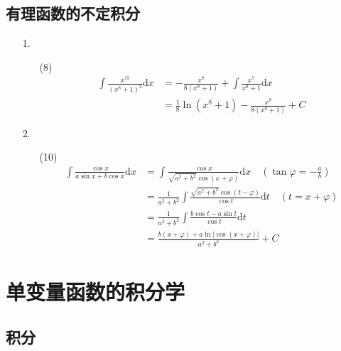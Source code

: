 \documentclass[oneside]{ctexbook} %
\begin{document}
\section{有理函数的不定积分}

\begin{enumerate}
    \item[1.]
    \begin{enumerate}
        \item[(8)]
        $$
        \begin{aligned}
            \int \frac{x^{15}}{(x^8 + 1)^2} \mathrm dx &= - \frac{x^8}{8(x^8 + 1)} + \int \frac{x^7}{x^8 + 1} \mathrm dx \\
            &= \frac 1 8 \ln(x^8 + 1) - \frac{x^8}{8(x^8 + 1)} + C
        \end{aligned}
        $$
    \end{enumerate}
    \item[2.]
    \begin{enumerate}
        \item[(10)]
        $$
        \begin{aligned}
            \int \frac{\cos x}{a\sin x + b\cos x} \mathrm dx &= \int \frac{\cos x}{\sqrt{a^2 + b^2} \cos(x + \varphi)} \mathrm dx \quad (\tan \varphi = - \frac a b) \\
            &= \frac 1 {a^2 + b^2} \int \frac{\sqrt{a^2 + b^2} \cos (t - \varphi)}{\cos t} \mathrm dt \quad (t = x + \varphi) \\
            &= \frac 1 {a^2 + b^2} \int \frac{b\cos t - a\sin t}{\cos t} \mathrm dt \\
            &= \frac{b(x + \varphi) + a \ln|\cos(x + \varphi)|}{a^2 + b^2} + C
        \end{aligned}
        $$
    \end{enumerate}
\end{enumerate}

\newpage

\chapter{单变量函数的积分学}

\section{积分}
\end{document}
